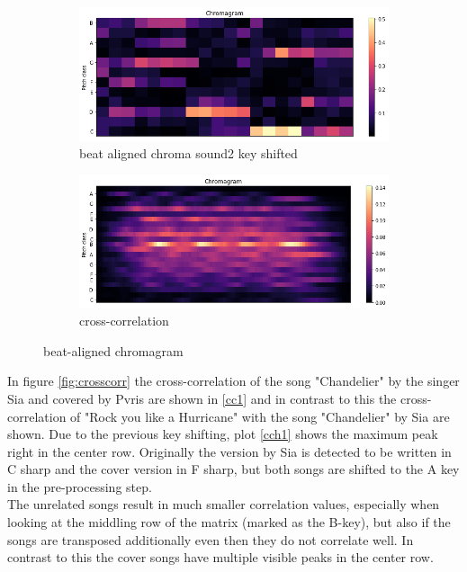 \begin{figure}[htbp]
{{			\begin{subfigure}{.495\textwidth}
				\centering     
				\includegraphics[scale=0.3]{Images/Chroma/beatalignedchroma2_ks.png}
				\caption{beat aligned chroma sound2 key shifted}
				\label{cks2}
			\end{subfigure}%
			\begin{subfigure}{.495\textwidth}
				\centering     
				\includegraphics[scale=0.3]{Images/Chroma/beatalignedchroma_corr.png}
				\caption{cross-correlation}
				\label{c2}
			\end{subfigure}%
	}}
	\caption{beat-aligned chromagram}
	\label{fig:beatalign}
\end{figure}
In figure \ref{fig:crosscorr} the cross-correlation of the song "Chandelier" by the singer Sia and covered by Pvris are shown in \ref{cc1} and in contrast to this the cross-correlation of "Rock you like a Hurricane" with the song "Chandelier" by Sia are shown. Due to the previous key shifting, plot \ref{cch1} shows the maximum peak right in the center row. Originally the version by Sia is detected to be written in C sharp and the cover version in F sharp, but both songs are shifted to the A key in the pre-processing step.\\
The unrelated songs result in much smaller correlation values, especially when looking at the middling row of the matrix (marked as the B-key), but also if the songs are transposed additionally even then they do not correlate well. In contrast to this the cover songs have multiple visible peaks in the center row. 
